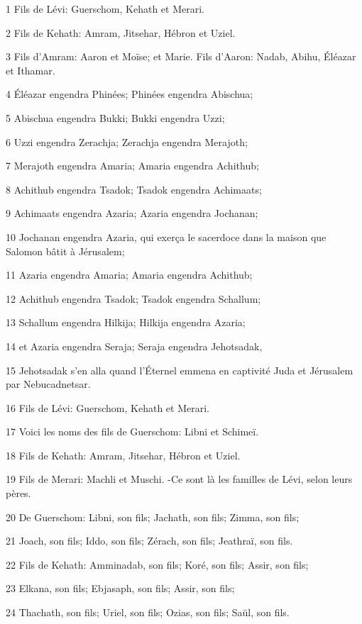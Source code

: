 \par 1 Fils de Lévi: Guerschom, Kehath et Merari.
\par 2 Fils de Kehath: Amram, Jitsehar, Hébron et Uziel.
\par 3 Fils d'Amram: Aaron et Moïse; et Marie. Fils d'Aaron: Nadab, Abihu, Éléazar et Ithamar.
\par 4 Éléazar engendra Phinées; Phinées engendra Abischua;
\par 5 Abischua engendra Bukki; Bukki engendra Uzzi;
\par 6 Uzzi engendra Zerachja; Zerachja engendra Merajoth;
\par 7 Merajoth engendra Amaria; Amaria engendra Achithub;
\par 8 Achithub engendra Tsadok; Tsadok engendra Achimaats;
\par 9 Achimaats engendra Azaria; Azaria engendra Jochanan;
\par 10 Jochanan engendra Azaria, qui exerça le sacerdoce dans la maison que Salomon bâtit à Jérusalem;
\par 11 Azaria engendra Amaria; Amaria engendra Achithub;
\par 12 Achithub engendra Tsadok; Tsadok engendra Schallum;
\par 13 Schallum engendra Hilkija; Hilkija engendra Azaria;
\par 14 et Azaria engendra Seraja; Seraja engendra Jehotsadak,
\par 15 Jehotsadak s'en alla quand l'Éternel emmena en captivité Juda et Jérusalem par Nebucadnetsar.
\par 16 Fils de Lévi: Guerschom, Kehath et Merari.
\par 17 Voici les noms des fils de Guerschom: Libni et Schimeï.
\par 18 Fils de Kehath: Amram, Jitsehar, Hébron et Uziel.
\par 19 Fils de Merari: Machli et Muschi. -Ce sont là les familles de Lévi, selon leurs pères.
\par 20 De Guerschom: Libni, son fils; Jachath, son fils; Zimma, son fils;
\par 21 Joach, son fils; Iddo, son fils; Zérach, son fils; Jeathraï, son fils.
\par 22 Fils de Kehath: Amminadab, son fils; Koré, son fils; Assir, son fils;
\par 23 Elkana, son fils; Ebjasaph, son fils; Assir, son fils;
\par 24 Thachath, son fils; Uriel, son fils; Ozias, son fils; Saül, son fils.
